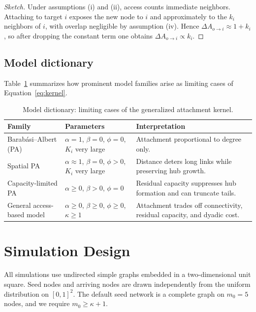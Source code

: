 \documentclass[11pt]{article}
\begin{document}
\begin{proof}[Sketch]
Under assumptions (i) and (ii), access counts immediate neighbors. Attaching to target $i$ exposes the new node to $i$ and approximately to the $k_i$ neighbors of $i$, with overlap negligible by assumption (iv). Hence $\Delta A_{o\to i}\approx 1+k_i$, so after dropping the constant term one obtains $\Delta A_{o\to i}\propto k_i$.
\end{proof}

\subsection{Model dictionary}

Table~\ref{tab:dictionary} summarizes how prominent model families arise as limiting cases of Equation~\ref{eq:kernel}.

\begin{table}[htbp]
\centering
\caption{Model dictionary: limiting cases of the generalized attachment kernel.}
\label{tab:dictionary}
\begin{tabular}{@{}>{\raggedright\arraybackslash}p{3.0cm}>{\raggedright\arraybackslash}p{4.0cm}>{\raggedright\arraybackslash}p{6.0cm}@{}}
\toprule
Family & Parameters & Interpretation \\
\midrule
Barab\'asi--Albert (PA) & $\alpha=1$, $\beta=0$, $\phi=0$, $K_i$ very large & Attachment proportional to degree only. \\
Spatial PA & $\alpha\approx 1$, $\beta=0$, $\phi>0$, $K_i$ very large & Distance deters long links while preserving hub growth. \\
Capacity-limited PA & $\alpha\ge 0$, $\beta>0$, $\phi=0$ & Residual capacity suppresses hub formation and can truncate tails. \\
General access-based model & $\alpha\ge 0$, $\beta\ge 0$, $\phi\ge 0$, $\kappa\ge 1$ & Attachment trades off connectivity, residual capacity, and dyadic cost. \\
\bottomrule
\end{tabular}
\end{table}

\section{Simulation Design}
\label{sec:design}

All simulations use undirected simple graphs embedded in a two-dimensional unit square. Seed nodes and arriving nodes are drawn independently from the uniform distribution on $[0,1]^2$. The default seed network is a complete graph on $m_0=5$ nodes, and we require $m_0 \ge \kappa + 1$.
\end{document}
